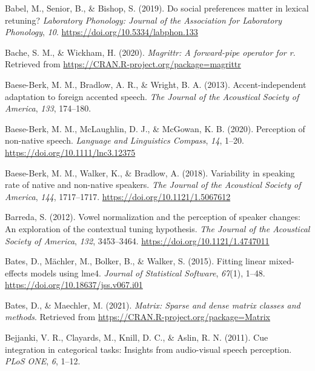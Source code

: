 \documentclass[
  11pt,
  english,
  man,floatsintext]{apa6}
\newlength{\cslhangindent}
\newlength{\cslentryspacingunit} %
\newenvironment{CSLReferences}[2] %
 {%
  \setlength{\parindent}{0pt}
  \ifodd #1
  \let\oldpar\par
  \def\par{\hangindent=\cslhangindent\oldpar}
  \fi
  \setlength{\parskip}{#2\cslentryspacingunit}
 }%
 {}
\begin{document}
\begin{CSLReferences}{1}{0}
\leavevmode{}%
Babel, M., Senior, B., \& Bishop, S. (2019). Do social preferences matter in lexical retuning? \emph{Laboratory Phonology: Journal of the Association for Laboratory Phonology}, \emph{10}. \url{https://doi.org/10.5334/labphon.133}

\leavevmode{}%
Bache, S. M., \& Wickham, H. (2020). \emph{Magrittr: A forward-pipe operator for r}. Retrieved from \url{https://CRAN.R-project.org/package=magrittr}

\leavevmode{}%
Baese-Berk, M. M., Bradlow, A. R., \& Wright, B. A. (2013). Accent-independent adaptation to foreign accented speech. \emph{The Journal of the Acoustical Society of America}, \emph{133}, 174--180.

\leavevmode{}%
Baese-Berk, M. M., McLaughlin, D. J., \& McGowan, K. B. (2020). Perception of non-native speech. \emph{Language and Linguistics Compass}, \emph{14}, 1--20. \url{https://doi.org/10.1111/lnc3.12375}

\leavevmode{}%
Baese-Berk, M. M., Walker, K., \& Bradlow, A. (2018). Variability in speaking rate of native and non-native speakers. \emph{The Journal of the Acoustical Society of America}, \emph{144}, 1717--1717. \url{https://doi.org/10.1121/1.5067612}

\leavevmode{}%
Barreda, S. (2012). Vowel normalization and the perception of speaker changes: An exploration of the contextual tuning hypothesis. \emph{The Journal of the Acoustical Society of America}, \emph{132}, 3453--3464. \url{https://doi.org/10.1121/1.4747011}

\leavevmode{}%
Bates, D., Mächler, M., Bolker, B., \& Walker, S. (2015). Fitting linear mixed-effects models using {lme4}. \emph{Journal of Statistical Software}, \emph{67}(1), 1--48. \url{https://doi.org/10.18637/jss.v067.i01}

\leavevmode{}%
Bates, D., \& Maechler, M. (2021). \emph{Matrix: Sparse and dense matrix classes and methods}. Retrieved from \url{https://CRAN.R-project.org/package=Matrix}

\leavevmode{}%
Bejjanki, V. R., Clayards, M., Knill, D. C., \& Aslin, R. N. (2011). Cue integration in categorical tasks: Insights from audio-visual speech perception. \emph{PLoS ONE}, \emph{6}, 1--12.


\end{CSLReferences}
\end{document}
